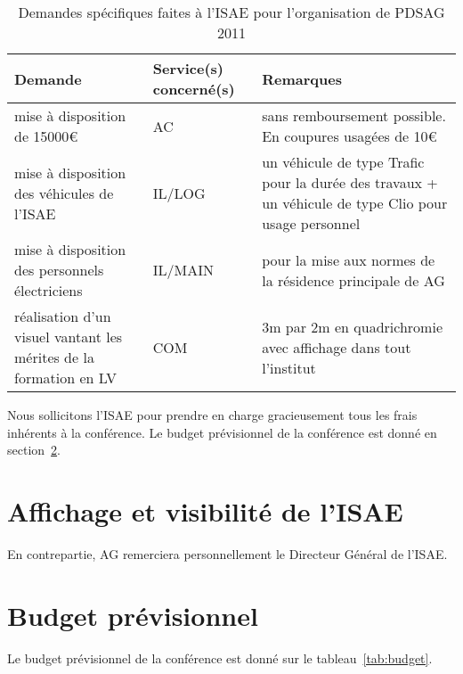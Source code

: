 \documentclass[french]{supaero-orga}
\def\EUR{{\euro}}
\begin{document}
\begin{table}[h]
  \centering
  \begin{tabular}[h]{p{} l p{}}
    \toprule[1.5pt]
    \textbf{Demande} & \textbf{Service(s) concerné(s)} & \textbf{Remarques}\\
    \midrule
    mise à disposition de 15000\EUR & AC & sans remboursement
    possible. En coupures usagées de 10\EUR\\

    mise à disposition des véhicules de l'ISAE & IL/LOG & un véhicule
    de type Trafic pour la durée des travaux + un véhicule de type
    Clio pour usage personnel \\
    
    mise à disposition des personnels électriciens &
    IL/MAIN & pour la mise aux normes de la résidence principale de AG\\

    réalisation d'un visuel vantant les mérites de la formation en LV
    & COM 
    & 3m par 2m en quadrichromie avec affichage dans tout l'institut\\
    \bottomrule[1.5pt]
  \end{tabular}
  \caption{Demandes spécifiques faites à l'ISAE pour l'organisation
    de PDSAG 2011}
  \label{tab:demandes}
\end{table}

Nous sollicitons l'ISAE pour prendre en charge gracieusement tous les
frais inhérents à la conférence. Le budget prévisionnel de la
conférence est donné en section~\ref{sec:budget-previsionnel}.

\section{Affichage et visibilité de l'ISAE}
\label{sec:affich-et-visib}

En contrepartie, AG remerciera personnellement le Directeur Général de
l'ISAE.

\section{Budget prévisionnel}
\label{sec:budget-previsionnel}

Le budget prévisionnel de la conférence est donné sur le
tableau~\ref{tab:budget}.
\end{document}
